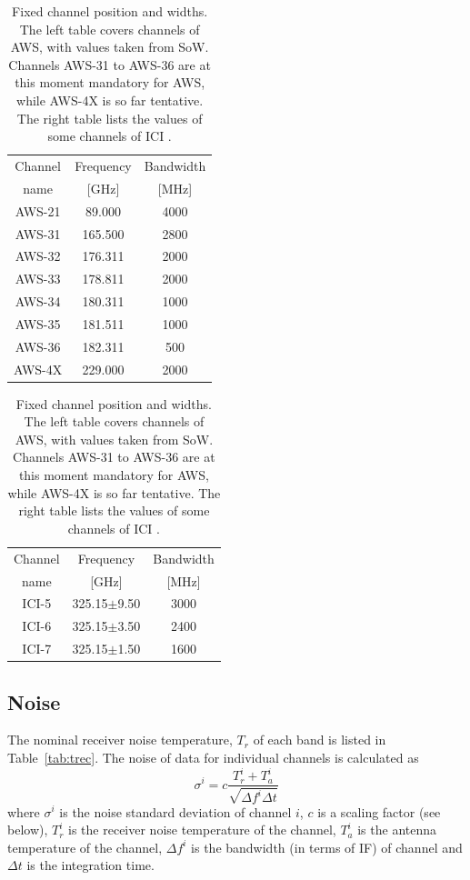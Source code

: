 \documentclass[12pt]{article}
\begin{document}
\begin{table}[!b]
  \begin{minipage}[b]{0.5\linewidth}
  \centering  
  \begin{tabular}[c]{c|c|c}
    Channel & Frequency   & Bandwidth \\
    name    & [GHz] &  [MHz] \\
    \hline
    AWS-21  & \phantom{0}89.000 & 4000\\
    AWS-31  & 165.500 & 2800\\
    AWS-32  & 176.311 & 2000\\
    AWS-33  & 178.811 & 2000\\
    AWS-34  & 180.311 & 1000\\
    AWS-35  & 181.511 & 1000\\
    AWS-36  & 182.311 & \phantom{0}500\\
    AWS-4X  & 229.000 & 2000\\
    \hline
  \end{tabular}
  \end{minipage}%
  \begin{minipage}[b]{0.5\linewidth}
  \centering  
  \begin{tabular}[c]{c|c|c}
    Channel & Frequency   & Bandwidth \\
    name    & [GHz] &  [MHz] \\
    \hline
    ICI-5  & 325.15$\pm$9.50 & 3000\\
    ICI-6  & 325.15$\pm$3.50 & 2400\\
    ICI-7  & 325.15$\pm$1.50 & 1600\\
    \hline
  \end{tabular}
  \end{minipage}  
  \caption{Fixed channel position and widths. The left table covers channels of
    AWS, with values taken from SoW. Channels AWS-31 to AWS-36 are at this
    moment mandatory for AWS, while AWS-4X is so far tentative. The right table
    lists the values of some channels of ICI \citep{eriksson:towar:20}.}
  \label{tab:fixed:chs}
\end{table}


\subsection{Noise}
%
The nominal receiver noise temperature, $T_r$ of each band is listed in
Table~\ref{tab:trec}. The noise of data for individual channels is calculated
as
\begin{equation}
  \sigma^i = c \frac{T^i_r+T^i_a}{\sqrt{\Delta\!f^i\Delta t}}
  \label{eq:noise}
\end{equation}
where $\sigma^i$ is the noise standard deviation of channel $i$, $c$ is a
scaling factor (see below), $T^i_r$ is the receiver noise temperature of the
channel, $T^i_a$ is the antenna temperature of the channel, $\Delta\!f^i$ is
the bandwidth (in terms of IF) of channel and $\Delta t$ is the integration
time.
\end{document}
